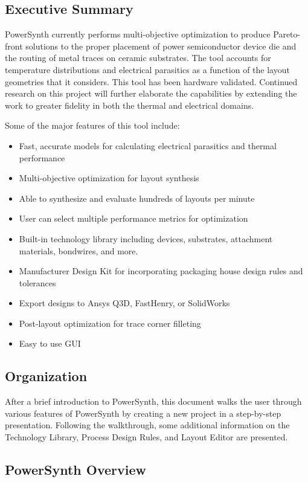 \documentclass[11pt]{article}
\begin{document}
\subsection{Executive Summary}
\label{sec-1-1}

PowerSynth currently performs multi-objective optimization to produce Pareto-front solutions to the proper placement of power semiconductor device die and the routing of metal traces on ceramic substrates. The tool accounts for temperature distributions and electrical parasitics as a function of the layout geometries that it considers. This tool has been hardware validated. Continued research on this project will further elaborate the capabilities by extending the work to greater fidelity in both the thermal and electrical domains.

Some of the major features of this tool include:
\begin{itemize}
\item Fast, accurate models for calculating electrical parasitics and thermal performance
\item Multi-objective optimization for layout synthesis
\item Able to synthesize and evaluate hundreds of layouts per minute
\item User can select multiple performance metrics for optimization
\item Built-in technology library including devices, substrates, attachment materials, bondwires, and more.
\item Manufacturer Design Kit for incorporating packaging house design rules and tolerances
\item Export designs to Ansys Q3D, FastHenry, or SolidWorks
\item Post-layout optimization for trace corner filleting
\item Easy to use GUI
\end{itemize}

\subsection{Organization}
\label{sec-1-2}

After a brief introduction to PowerSynth, this document walks the user through various features of PowerSynth by creating a new project in a step-by-step presentation. Following the walkthrough, some additional information on the Technology Library, Process Design Rules, and Layout Editor are presented.

\subsection{PowerSynth Overview}
\label{sec-1-3}
\end{document}
